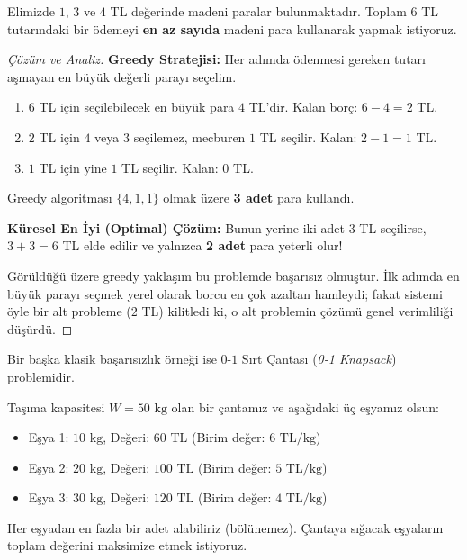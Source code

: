 \begin{example}
Elimizde $1$, $3$ ve $4$ TL değerinde madeni paralar bulunmaktadır. Toplam $6$ TL tutarındaki bir ödemeyi \textbf{en az sayıda} madeni para kullanarak yapmak istiyoruz.
\end{example}

\begin{proof}[Çözüm ve Analiz]
\textbf{Greedy Stratejisi:} Her adımda ödenmesi gereken tutarı aşmayan en büyük değerli parayı seçelim.
\begin{enumerate}
    \item $6$ TL için seçilebilecek en büyük para $4$ TL'dir. Kalan borç: $6 - 4 = 2$ TL.
    \item $2$ TL için $4$ veya $3$ seçilemez, mecburen $1$ TL seçilir. Kalan: $2 - 1 = 1$ TL.
    \item $1$ TL için yine $1$ TL seçilir. Kalan: $0$ TL.
\end{enumerate}
Greedy algoritması $\{4, 1, 1\}$ olmak üzere \textbf{3 adet} para kullandı.

\textbf{Küresel En İyi (Optimal) Çözüm:}
Bunun yerine iki adet $3$ TL seçilirse, $3 + 3 = 6$ TL elde edilir ve yalnızca \textbf{2 adet} para yeterli olur!

Görüldüğü üzere greedy yaklaşım bu problemde başarısız olmuştur. İlk adımda en büyük parayı seçmek yerel olarak borcu en çok azaltan hamleydi; fakat sistemi öyle bir alt probleme ($2$ TL) kilitledi ki, o alt problemin çözümü genel verimliliği düşürdü.
\end{proof}

Bir başka klasik başarısızlık örneği ise $0$-$1$ Sırt Çantası (\textit{0-1 Knapsack}) problemidir.

\begin{example}
Taşıma kapasitesi $W = 50\text{ kg}$ olan bir çantamız ve aşağıdaki üç eşyamız olsun:
\begin{itemize}
    \item Eşya 1: $10\text{ kg}$, Değeri: $60\text{ TL}$ (Birim değer: $6\text{ TL/kg}$)
    \item Eşya 2: $20\text{ kg}$, Değeri: $100\text{ TL}$ (Birim değer: $5\text{ TL/kg}$)
    \item Eşya 3: $30\text{ kg}$, Değeri: $120\text{ TL}$ (Birim değer: $4\text{ TL/kg}$)
\end{itemize}
Her eşyadan en fazla bir adet alabiliriz (bölünemez). Çantaya sığacak eşyaların toplam değerini maksimize etmek istiyoruz.
\end{example}


